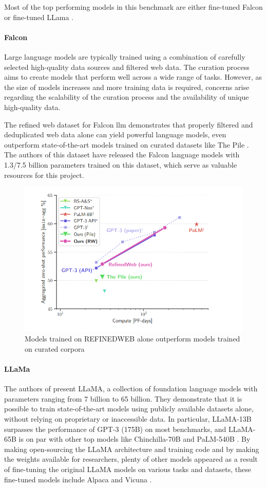 \documentclass[a4paper,12pt]{article}
\begin{document}
Most of the top performing models in this benchmark are either fine-tuned Falcon \cite{falcon} or fine-tuned LLama \cite{llama}.

\paragraph*{Falcon}
Large language models are typically trained using a combination of carefully selected high-quality data sources and filtered web data. 
The curation process aims to create models that perform well across a wide range of tasks. 
However, as the size of models increases and more training data is required, concerns arise regarding the scalability of the curation process and the availability of unique high-quality data.

The refined web dataset for Falcon llm \cite{falcondataset} demonstrates that properly filtered and deduplicated web data alone can yield powerful language models, 
even outperform state-of-the-art models trained on curated datasets like The Pile \cite{pile}. 
The authors of this dataset\cite{falcondataset} have released the Falcon \cite{falcon} language models with 1.3/7.5 billion parameters trained on this dataset, 
which serve as valuable resources for this project.

\begin{figure}[htbp]
	\centering
	\includegraphics[width=.5\linewidth]{figures/falcon.png}
	\caption{Models trained on REFINEDWEB \cite{falcondataset} alone outperform models trained on curated corpora}
	\label{fig:falcon}
\end{figure}

\paragraph*{LLaMa}
The authors of \cite{llama} present LLaMA, a collection of foundation language models with parameters ranging from 7 billion to 65 billion. 
They demonstrate that it is possible to train state-of-the-art models using publicly available datasets alone, without relying on proprietary or inaccessible data. 
In particular, LLaMA-13B surpasses the performance of GPT-3 (175B) \cite{gpt3} on most benchmarks, and LLaMA-65B is on par with other top models like Chinchilla-70B \cite{chinchilla} and PaLM-540B \cite{palm}. 
By making open-sourcing the LLaMA architecture and training code and by making the weights available for researchers, plenty of other models appeared as a result of fine-tuning the original LLaMA models on various tasks and datasets, 
these fine-tuned models include Alpaca \cite{alpaca} and Vicuna \cite{vicuna}.     
\end{document}
